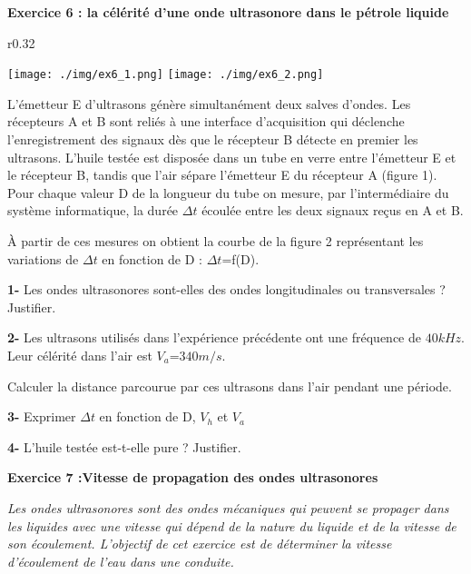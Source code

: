 \documentclass[12pt, french]{article}
\begin{document}
\begin{Box2}{\textbf{Exercice 6 : la célérité d’une onde ultrasonore dans le pétrole
liquide }}


\begin{wrapfigure}[15]{r}{0.32\textwidth}
  \begin{center}
	  \vspace{-0.56cm}
	\texttt{[image: ./img/ex6\_1.png]}
	\texttt{[image: ./img/ex6\_2.png]}
  \end{center}
\end{wrapfigure}



L’émetteur E d’ultrasons génère simultanément deux
salves d’ondes. Les récepteurs A et B sont reliés à une
interface d’acquisition qui déclenche l’enregistrement
des signaux dès que le récepteur B détecte en premier les
ultrasons. L’huile testée est disposée dans un tube en
verre entre l’émetteur E et le récepteur B, tandis que l’air
sépare l’émetteur E du récepteur A (figure 1).
Pour chaque valeur D de la longueur du tube on mesure, par l’intermédiaire du système
informatique, la durée $\Delta{t}$ écoulée entre les deux signaux
reçus en A et B.

À partir de ces mesures on obtient la courbe de la figure
2 représentant les variations de $\Delta{t}$ en
fonction de D : $\Delta{t}$=f(D).

\textbf{1- }Les ondes ultrasonores sont-elles des ondes
longitudinales ou transversales ? Justifier.

\textbf{2- }Les ultrasons utilisés dans l’expérience
précédente ont une fréquence de $40 kHz$. Leur
célérité dans l’air est $V_a$=$340m/s$.

Calculer la distance parcourue par ces ultrasons
dans l’air pendant une période.

\textbf{3- }Exprimer $\Delta{t}$ en fonction de D, $V_h$ et $V_a$

\textbf{4- }L’huile testée est-t-elle pure ? Justifier.

\end{Box2}

\begin{tcolorbox} \textbf{Exercice 7 :Vitesse de propagation des ondes ultrasonores }
\end{tcolorbox}
	\emph{Les ondes ultrasonores sont des ondes mécaniques qui peuvent se propager dans les liquides
avec une vitesse qui dépend de la nature du liquide et de la vitesse de son écoulement.
L’objectif de cet exercice est de déterminer la vitesse d’écoulement de l’eau dans une conduite.}
\end{document}
